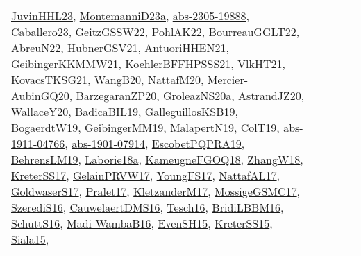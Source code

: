 {\begin{longtable}{lp{3cm}>{\raggedright}p{6cm}>{\raggedright}p{6cm}p{8cm}}
\href{papers/JuvinHHL23.pdf}{JuvinHHL23}\cite{JuvinHHL23}, \href{articles/MontemanniD23a.pdf}{MontemanniD23a}\cite{MontemanniD23a}, \href{articles/abs-2305-19888.pdf}{abs-2305-19888}\cite{abs-2305-19888}, \href{articles/Caballero23.pdf}{Caballero23}\cite{Caballero23}, \href{papers/GeitzGSSW22.pdf}{GeitzGSSW22}\cite{GeitzGSSW22}, \href{articles/PohlAK22.pdf}{PohlAK22}\cite{PohlAK22}, \href{articles/BourreauGGLT22.pdf}{BourreauGGLT22}\cite{BourreauGGLT22}, \href{articles/AbreuN22.pdf}{AbreuN22}\cite{AbreuN22}, \href{articles/HubnerGSV21.pdf}{HubnerGSV21}\cite{HubnerGSV21}, \href{papers/AntuoriHHEN21.pdf}{AntuoriHHEN21}\cite{AntuoriHHEN21}, \href{papers/GeibingerKKMMW21.pdf}{GeibingerKKMMW21}\cite{GeibingerKKMMW21}, \href{articles/KoehlerBFFHPSSS21.pdf}{KoehlerBFFHPSSS21}\cite{KoehlerBFFHPSSS21}, \href{articles/VlkHT21.pdf}{VlkHT21}\cite{VlkHT21}, \href{papers/KovacsTKSG21.pdf}{KovacsTKSG21}\cite{KovacsTKSG21}, \href{papers/WangB20.pdf}{WangB20}\cite{WangB20}, \href{papers/NattafM20.pdf}{NattafM20}\cite{NattafM20}, \href{papers/Mercier-AubinGQ20.pdf}{Mercier-AubinGQ20}\cite{Mercier-AubinGQ20}, \href{papers/BarzegaranZP20.pdf}{BarzegaranZP20}\cite{BarzegaranZP20}, \href{papers/GroleazNS20a.pdf}{GroleazNS20a}\cite{GroleazNS20a}, \href{articles/AstrandJZ20.pdf}{AstrandJZ20}\cite{AstrandJZ20}, \href{articles/WallaceY20.pdf}{WallaceY20}\cite{WallaceY20}, \href{papers/BadicaBIL19.pdf}{BadicaBIL19}\cite{BadicaBIL19}, \href{papers/GalleguillosKSB19.pdf}{GalleguillosKSB19}\cite{GalleguillosKSB19}, \href{papers/BogaerdtW19.pdf}{BogaerdtW19}\cite{BogaerdtW19}, \href{papers/GeibingerMM19.pdf}{GeibingerMM19}\cite{GeibingerMM19}, \href{papers/MalapertN19.pdf}{MalapertN19}\cite{MalapertN19}, \href{papers/ColT19.pdf}{ColT19}\cite{ColT19}, \href{articles/abs-1911-04766.pdf}{abs-1911-04766}\cite{abs-1911-04766}, \href{articles/abs-1901-07914.pdf}{abs-1901-07914}\cite{abs-1901-07914}, \href{articles/EscobetPQPRA19.pdf}{EscobetPQPRA19}\cite{EscobetPQPRA19}, \href{papers/BehrensLM19.pdf}{BehrensLM19}\cite{BehrensLM19}, \href{papers/Laborie18a.pdf}{Laborie18a}\cite{Laborie18a}, \href{papers/KameugneFGOQ18.pdf}{KameugneFGOQ18}\cite{KameugneFGOQ18}, \href{articles/ZhangW18.pdf}{ZhangW18}\cite{ZhangW18}, \href{articles/KreterSS17.pdf}{KreterSS17}\cite{KreterSS17}, \href{papers/GelainPRVW17.pdf}{GelainPRVW17}\cite{GelainPRVW17}, \href{papers/YoungFS17.pdf}{YoungFS17}\cite{YoungFS17}, \href{articles/NattafAL17.pdf}{NattafAL17}\cite{NattafAL17}, \href{papers/GoldwaserS17.pdf}{GoldwaserS17}\cite{GoldwaserS17}, \href{papers/Pralet17.pdf}{Pralet17}\cite{Pralet17}, \href{papers/KletzanderM17.pdf}{KletzanderM17}\cite{KletzanderM17}, \href{papers/MossigeGSMC17.pdf}{MossigeGSMC17}\cite{MossigeGSMC17}, \href{papers/SzerediS16.pdf}{SzerediS16}\cite{SzerediS16}, \href{papers/CauwelaertDMS16.pdf}{CauwelaertDMS16}\cite{CauwelaertDMS16}, \href{papers/Tesch16.pdf}{Tesch16}\cite{Tesch16}, \href{papers/BridiLBBM16.pdf}{BridiLBBM16}\cite{BridiLBBM16}, \href{papers/SchuttS16.pdf}{SchuttS16}\cite{SchuttS16}, \href{papers/Madi-WambaB16.pdf}{Madi-WambaB16}\cite{Madi-WambaB16}, \href{papers/EvenSH15.pdf}{EvenSH15}\cite{EvenSH15}, \href{papers/KreterSS15.pdf}{KreterSS15}\cite{KreterSS15}, \href{articles/Siala15.pdf}{Siala15}\cite{Siala15}, 
\end{longtable}}

